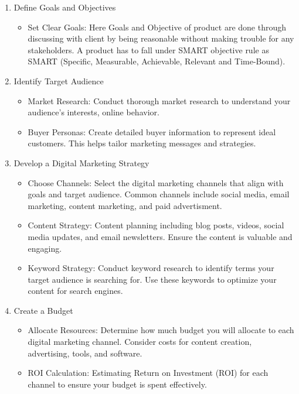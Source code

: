 \begin{enumerate}
    \item Define Goals and Objectives
    \begin{itemize}
        \item Set Clear Goals: Here Goals and Objective of product are done through discussing with client by being reasonable without making trouble for any stakeholders. A product has to fall under SMART objective rule as SMART (Specific, Measurable, Achievable, Relevant and Time-Bound).
    \end{itemize}

    \item Identify Target Audience
        \begin{itemize}
        \item Market Research: Conduct thorough market research to understand your audience's  interests, online behavior.
        \item Buyer Personas: Create detailed buyer information to represent ideal customers. This helps tailor marketing messages and strategies.
    \end{itemize}

     \item Develop a Digital Marketing Strategy
     \begin{itemize}
         \item Choose Channels: Select the digital marketing channels that align with goals and target audience. Common channels include social media, email marketing, content marketing, and paid advertisment.
         \item Content Strategy: Content planning including blog posts, videos, social media updates, and email newsletters. Ensure the content is valuable and engaging.
         \item Keyword Strategy: Conduct keyword research to identify terms your target audience is searching for. Use these keywords to optimize your content for search engines.
     \end{itemize}

    \item Create a Budget
    \begin{itemize}
        \item Allocate Resources: Determine how much budget you will allocate to each digital marketing channel. Consider costs for content creation, advertising, tools, and software.
        \item ROI Calculation: Estimating Return on Investment (ROI) for each channel to ensure your budget is spent effectively.
    \end{itemize}

\end{enumerate}

